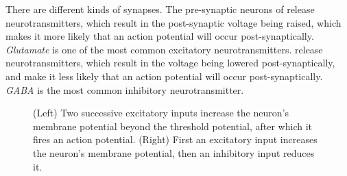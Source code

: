 There are different kinds of synapses. The pre-synaptic neurons of   release neurotransmitters, which result in the  post-synaptic voltage being raised, which makes it more likely that an action potential will occur post-synaptically. \emph{Glutamate} is one of the most common excitatory neurotransmitters.  release neurotransmitters, which result in the voltage being lowered post-synaptically, and make it less likely that an action potential will occur post-synaptically. \emph{GABA} is the most common  inhibitory neurotransmitter.

\begin{figure}[h]
\centering
{}
\caption[Adapted from original work by Pamela Payne.]{(Left) Two successive excitatory inputs increase the neuron's membrane potential beyond the threshold potential, after which it fires an action potential. (Right) First an excitatory input increases the neuron's membrane potential, then an inhibitory input reduces it. }
\label{membranePotential}
\end{figure}

